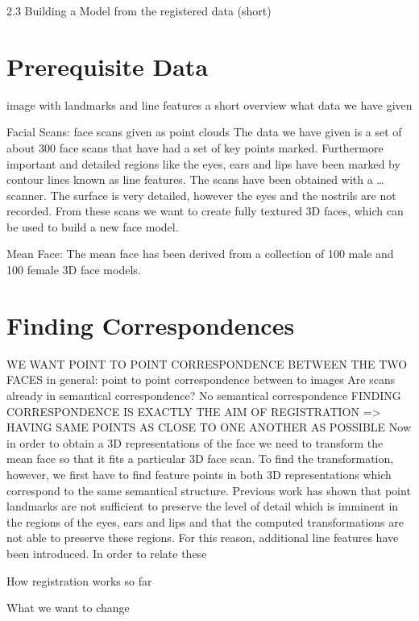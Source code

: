 2.3 Building a Model from the registered data (short)
\section{Prerequisite Data}
image with landmarks and line features
a short overview what data we have given

Facial Scans:
face scans given as point clouds
The data we have given is a set of about 300 face scans that have had a set of key points marked. Furthermore important and detailed regions like the eyes, ears and lips have been marked by contour lines known as line features. The scans have been obtained with a … scanner. The surface is very detailed, however the eyes and the nostrils are not recorded. From these scans we want to create fully textured 3D faces, which can be used to build a new face model.

Mean Face:
The mean face has been derived from a collection of 100 male and 100 female 3D face models.


\section{Finding Correspondences}
WE WANT POINT TO POINT CORRESPONDENCE BETWEEN THE TWO FACES
in general: point to point correspondence between to images
Are scans already in semantical correspondence? No semantical correspondence
FINDING CORRESPONDENCE IS EXACTLY THE AIM OF REGISTRATION => HAVING SAME POINTS AS CLOSE TO ONE ANOTHER AS POSSIBLE
Now in order to obtain a 3D representations of the face we need to transform the mean face so that it fits a particular 3D face scan. To find the transformation, however, we first have to find feature points in both 3D representations which correspond to the same semantical structure. Previous work has shown that point landmarks are not sufficient to preserve the level of detail which is imminent in the regions of the eyes, ears and lips and that the computed transformations are not able to preserve these regions. For this reason, additional line features have been introduced. In order to relate these 

How registration works so far

What we want to change


